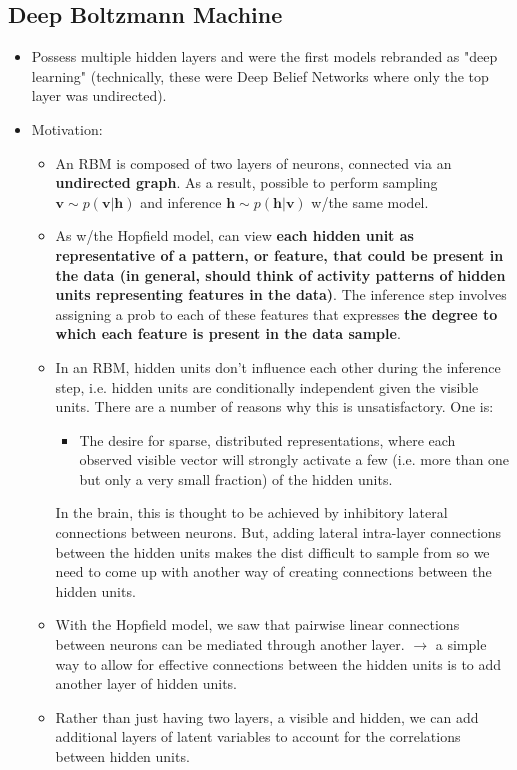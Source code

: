 \documentclass[norsk,a4paper,11pt]{article}
\begin{document}
\subsection{Deep Boltzmann Machine}
\begin{itemize}
	\item Possess multiple hidden layers and were the first models rebranded as "deep learning" (technically, these were Deep Belief Networks where only the top layer was undirected).
	\item Motivation:
	\begin{itemize}
		\item An RBM is composed of two layers of neurons, connected via an \textbf{undirected graph}. As a result, possible to perform sampling $\bm{v} \sim p(\bm{v}|\bm{h})$ and inference $\bm{h} \sim p(\bm{h}|\bm{v})$ w/the same model.
		\item As w/the Hopfield model, can view \textbf{each hidden unit as representative of a pattern, or feature, that could be present in the data (in general, should think of activity patterns of hidden units representing features in the data)}. The inference step involves assigning a prob to each of these features that expresses \textbf{the degree to which each feature is present in the data sample}.
		\item In an RBM, hidden units don't influence each other during the inference step, i.e. hidden units are conditionally independent given the visible units. There are a number of reasons why this is unsatisfactory. One is:
		\begin{itemize}
			\item The desire for sparse, distributed representations, where each observed visible vector will strongly activate a few (i.e. more than one but only a very small fraction) of the hidden units. 
		\end{itemize}
		In the brain, this is thought to be achieved by inhibitory lateral connections between neurons. But, adding lateral intra-layer connections between the hidden units makes the dist difficult to sample from so we need to come up with another way of creating connections between the hidden units.
		\item With the Hopfield model, we saw that pairwise linear connections between neurons can be mediated through another layer. $\rightarrow$ a simple way to allow for effective connections between the hidden units is to add another layer of hidden units. 
		\item Rather than just having two layers, a visible and hidden, we can add additional layers of latent variables to account for the correlations between hidden units. 

\end{itemize}
\end{itemize}
\end{document}
